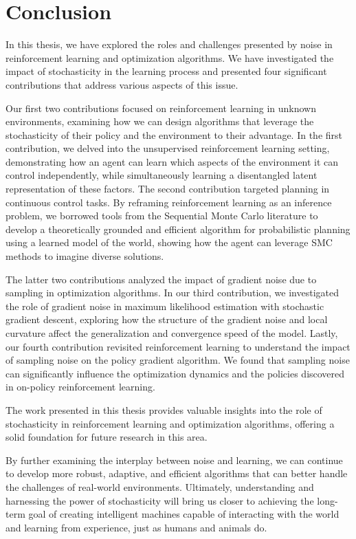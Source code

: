  \chapter*{Conclusion}

In this thesis, we have explored the roles and challenges presented by noise in reinforcement learning and optimization algorithms. We have investigated the impact of stochasticity in the learning process and presented four significant contributions that address various aspects of this issue.

Our first two contributions focused on reinforcement learning in unknown environments, examining how we can design algorithms that leverage the stochasticity of their policy and the environment to their advantage. In the first contribution, we delved into the unsupervised reinforcement learning setting, demonstrating how an agent can learn which aspects of the environment it can control independently, while simultaneously learning a disentangled latent representation of these factors. The second contribution targeted planning in continuous control tasks. By reframing reinforcement learning as an inference problem, we borrowed tools from the Sequential Monte Carlo literature to develop a theoretically grounded and efficient algorithm for probabilistic planning using a learned model of the world, showing how the agent can leverage SMC methods to imagine diverse solutions.

The latter two contributions analyzed the impact of gradient noise due to sampling in optimization algorithms. In our third contribution, we investigated the role of gradient noise in maximum likelihood estimation with stochastic gradient descent, exploring how the structure of the gradient noise and local curvature affect the generalization and convergence speed of the model. Lastly, our fourth contribution revisited reinforcement learning to understand the impact of sampling noise on the policy gradient algorithm. We found that sampling noise can significantly influence the optimization dynamics and the policies discovered in on-policy reinforcement learning.

The work presented in this thesis provides valuable insights into the role of stochasticity in reinforcement learning and optimization algorithms, offering a solid foundation for future research in this area.

By further examining the interplay between noise and learning, we can continue to develop more robust, adaptive, and efficient algorithms that can better handle the challenges of real-world environments. Ultimately, understanding and harnessing the power of stochasticity will bring us closer to achieving the long-term goal of creating intelligent machines capable of interacting with the world and learning from experience, just as humans and animals do.




 
 







